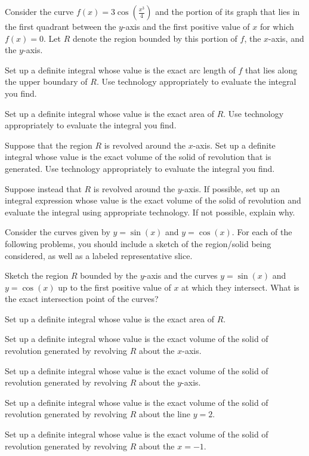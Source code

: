 \begin{exercises} 

  \item Consider the curve $f(x) = 3 \cos(\frac{x^3}{4})$ and the portion of its graph that lies in the first quadrant between the $y$-axis and the first positive value of $x$ for which $f(x) = 0$.  Let  $R$ denote the region bounded by this portion of $f$, the $x$-axis, and the $y$-axis.  
   \ba
   		\item Set up a definite integral whose value is the exact arc length of $f$ that lies along the upper boundary of $R$.  Use technology appropriately to evaluate the integral you find. 	
		\item Set up a definite integral whose value is the exact area of $R$.  Use technology appropriately to evaluate the integral you find. 	
		\item Suppose that the region $R$ is revolved around the $x$-axis.  Set up a definite integral whose value is the exact volume of the solid of revolution that is generated.   Use technology appropriately to evaluate the integral you find. 	
		\item Suppose instead that $R$ is revolved around the $y$-axis.  If possible, set up an integral expression whose value is the exact volume of the solid of revolution and evaluate the integral using appropriate technology.  If not possible, explain why. 
   \ea

\item Consider the curves given by $y = \sin(x)$ and $y = \cos(x)$.  For each of the following problems, you should include a sketch of the region/solid being considered, as well as a labeled representative slice.
	\ba
		\item Sketch the region $R$ bounded by the $y$-axis and the curves $y = \sin(x)$ and $y = \cos(x)$ up to the first positive value of $x$ at which they intersect. What is the exact intersection point of the curves?
		\item Set up a definite integral whose value is the exact area of $R$.
		\item Set up a definite integral whose value is the exact volume of the solid  of revolution generated by revolving $R$ about the $x$-axis.
		\item Set up a definite integral whose value is the exact volume of the solid  of revolution generated by revolving $R$ about the $y$-axis.
		\item Set up a definite integral whose value is the exact volume of the solid  of revolution generated by revolving $R$ about the line $y = 2$.
		\item Set up a definite integral whose value is the exact volume of the solid  of revolution generated by revolving $R$ about the $x = -1$.
	\ea



\end{exercises}
